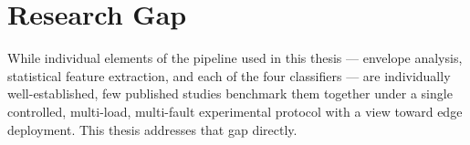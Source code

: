 \section{Research Gap}
While individual elements of the pipeline used in this thesis --- envelope analysis,
statistical feature extraction, and each of the four classifiers --- are individually
well-established, few published studies benchmark them together under a single controlled,
multi-load, multi-fault experimental protocol with a view toward edge deployment. This thesis
addresses that gap directly.

